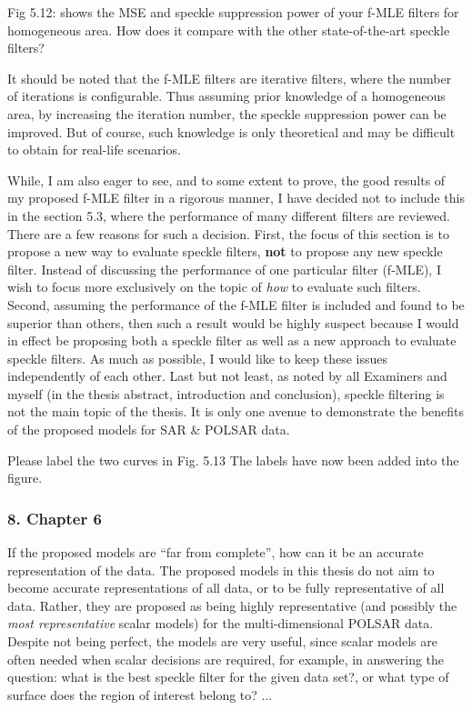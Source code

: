 \replyToComment
    {Fig 5.12: shows the MSE and speckle suppression power of your f-MLE filters for homogeneous area. How does it compare with the other state-of-the-art speckle filters?}
    {
      It should be noted that the f-MLE filters are iterative filters, where the number of iterations is configurable.
      Thus assuming prior knowledge of a homogeneous area, by increasing the iteration number, the speckle suppression power can be improved.
      But of course, such knowledge is only theoretical and may be difficult to obtain for real-life scenarios.

While, I am also eager to see, and to some extent to prove, the good results of my proposed f-MLE filter in a rigorous manner,
  I have decided not to include this in the section 5.3, where the performance of many different filters are reviewed.
There are a few reasons for such a decision.
First, the focus of this section is to propose a new way to evaluate speckle filters, \textbf{not} to propose any new speckle filter.
Instead of discussing the performance of one particular filter (f-MLE), I wish to focus more exclusively on the topic of \textit{how} to evaluate such filters.
Second, assuming the performance of the f-MLE filter is included and found to be superior than others,
  then such a result would be highly suspect
because I would in effect be proposing both a speckle filter as well as a new approach to evaluate speckle filters.
As much as possible, I would like to keep these issues independently of each other.
Last but not least, as noted by all Examiners and myself (in the thesis abstract, introduction and conclusion), speckle filtering is not the main topic of the thesis.
It is only one avenue to demonstrate the benefits of the proposed models for SAR \& POLSAR data.
    }

\replyToComment
    {Please label the two curves in Fig. 5.13}
    {The labels have now been added into the figure.}    

\subsubsection*{8. Chapter 6}

\replyToComment
    {If the proposed models are ``far from complete'', how can it be an accurate representation of the data.}
    {The proposed models in this thesis do not aim to become accurate representations of all data, or to be fully representative of all data.
Rather, they are proposed as being highly representative (and possibly the \textit{most representative} scalar models) for the multi-dimensional POLSAR data.
Despite not being perfect, the models are very useful, since scalar models are often needed when scalar decisions are required,
  for example, in answering the question: what is the best speckle filter for the given data set?, or what type of surface does the region of interest belong to? ...
}

